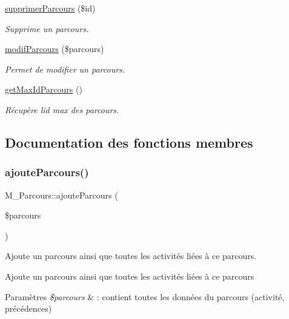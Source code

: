 \begin{DoxyCompactItemize}
\hyperlink{class_m___parcours_a7ddb21f04f791c494ffa9b0762b7e6d2}{supprimer\+Parcours} (\$id)
\begin{DoxyCompactList}\small\item\em Supprime un parcours. \end{DoxyCompactList}\item 
\hyperlink{class_m___parcours_a6ce48cebbfa02280dd258b5b8f9e7357}{modif\+Parcours} (\$parcours)
\begin{DoxyCompactList}\small\item\em Permet de modifier un parcours. \end{DoxyCompactList}\item 
\hyperlink{class_m___parcours_a3a7e638bb3d1fbfd4e8bbeb8627b0e71}{get\+Max\+Id\+Parcours} ()
\begin{DoxyCompactList}\small\item\em Récupère l\textquotesingle{}id max des parcours. \end{DoxyCompactList}\end{DoxyCompactItemize}


\subsection{Documentation des fonctions membres}
\mbox{\label{class_m___parcours_a898f1da8fda950ebdc6cd0f98ecacc2a}} 
\subsubsection{\texorpdfstring{ajoute\+Parcours()}{ajouteParcours()}}
{\footnotesize\ttfamily M\+\_\+\+Parcours\+::ajoute\+Parcours (\begin{DoxyParamCaption}\item[{}]{\$parcours }\end{DoxyParamCaption})}



Ajoute un parcours ainsi que toutes les activités liées à ce parcours. 

Ajoute un parcours ainsi que toutes les activités liées à ce parcours 
\begin{DoxyParams}{Paramètres}
{\em \$parcours} & \+: contient toutes les données du parcours (activité, précédences) \\
\hline
\end{DoxyParams}
\mbox{\label{class_m___parcours_a8327d770151bc091fc57c433ba55d2d3}} 
